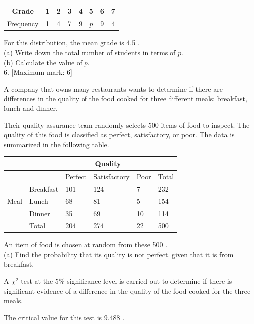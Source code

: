 \documentclass[10pt]{article}
\begin{document}
\begin{center}
\begin{tabular}{|c|c|c|c|c|c|c|c|}
\hline
Grade & 1 & 2 & 3 & 4 & 5 & 6 & 7 \\
\hline
Frequency & 1 & 4 & 7 & 9 & $p$ & 9 & 4 \\
\hline
\end{tabular}
\end{center}

For this distribution, the mean grade is 4.5 .\\
(a) Write down the total number of students in terms of $p$.\\
(b) Calculate the value of $p$.\\[0pt]
6. [Maximum mark: 6]

A company that owns many restaurants wants to determine if there are differences in the quality of the food cooked for three different meals: breakfast, lunch and dinner.

Their quality assurance team randomly selects 500 items of food to inspect. The quality of this food is classified as perfect, satisfactory, or poor. The data is summarized in the following table.

\begin{center}
\begin{tabular}{|l|l|l|l|l|l|}
\hline
\multicolumn{2}{|c|}{\multirow{2}{*}{}} & \multicolumn{3}{|c|}{Quality} &  \\
\hline
 &  & Perfect & Satisfactory & Poor & Total \\
\hline
\multirow{3}{*}{Meal} & Breakfast & 101 & 124 & 7 & 232 \\
\hline
 & Lunch & 68 & 81 & 5 & 154 \\
\hline
 & Dinner & 35 & 69 & 10 & 114 \\
\hline
 & Total & 204 & 274 & 22 & 500 \\
\hline
\end{tabular}
\end{center}

An item of food is chosen at random from these 500 .\\
(a) Find the probability that its quality is not perfect, given that it is from breakfast.

A $\chi^{2}$ test at the $5 \%$ significance level is carried out to determine if there is significant evidence of a difference in the quality of the food cooked for the three meals.

The critical value for this test is 9.488 .
\end{document}

